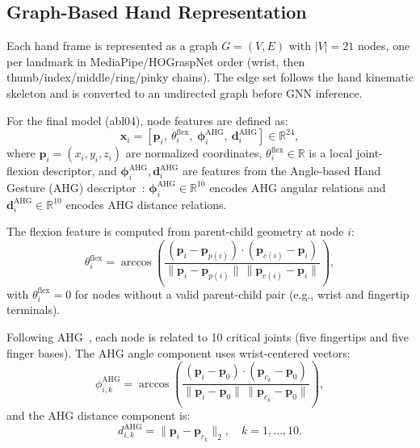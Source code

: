 \documentclass[letterpaper, 10 pt, conference]{ieeeconf}  %
\begin{document}
\subsection{Graph-Based Hand Representation}

Each hand frame is represented as a graph \(G=(V,E)\) with \(|V|=21\) nodes, one per landmark in MediaPipe/HOGraspNet order (wrist, then thumb/index/middle/ring/pinky chains). The edge set follows the hand kinematic skeleton and is converted to an undirected graph before GNN inference.

For the final model (abl04), node features are defined as:
\begin{equation}
\mathbf{x}_i=\left[\mathbf{p}_i,\ \theta_i^{\text{flex}},\ \boldsymbol{\phi}_i^{\text{AHG}},\ \mathbf{d}_i^{\text{AHG}}\right] \in \mathbb{R}^{24},
\end{equation}
where \(\mathbf{p}_i=(x_i,y_i,z_i)\) are normalized coordinates, \(\theta_i^{\text{flex}}\in\mathbb{R}\) is a local joint-flexion descriptor, and \(\boldsymbol{\phi}_i^{\text{AHG}}, \mathbf{d}_i^{\text{AHG}}\) are features from the Angle-based Hand Gesture (AHG) descriptor~\cite{aiman_anglebas2024b}: \(\boldsymbol{\phi}_i^{\text{AHG}}\in\mathbb{R}^{10}\) encodes AHG angular relations and \(\mathbf{d}_i^{\text{AHG}}\in\mathbb{R}^{10}\) encodes AHG distance relations.

The flexion feature is computed from parent-child geometry at node \(i\):
\begin{equation}
\theta_i^{\text{flex}}=\arccos\!\left(
\frac{(\mathbf{p}_i-\mathbf{p}_{p(i)})\cdot(\mathbf{p}_{c(i)}-\mathbf{p}_i)}
{\|\mathbf{p}_i-\mathbf{p}_{p(i)}\|\,\|\mathbf{p}_{c(i)}-\mathbf{p}_i\|}
\right),
\end{equation}
with \(\theta_i^{\text{flex}}=0\) for nodes without a valid parent-child pair (e.g., wrist and fingertip terminals).

Following AHG~\cite{aiman_ahg2024}, each node is related to 10 critical joints (five fingertips and five finger bases). The AHG angle component uses wrist-centered vectors:
\begin{equation}
\phi_{i,k}^{\text{AHG}}=
\arccos\!\left(
\frac{(\mathbf{p}_i-\mathbf{p}_0)\cdot(\mathbf{p}_{c_k}-\mathbf{p}_0)}
{\|\mathbf{p}_i-\mathbf{p}_0\|\,\|\mathbf{p}_{c_k}-\mathbf{p}_0\|}
\right),
\end{equation}
and the AHG distance component is:
\begin{equation}
d_{i,k}^{\text{AHG}}=\|\mathbf{p}_i-\mathbf{p}_{c_k}\|_2,\quad k=1,\dots,10.
\end{equation}
\end{document}
